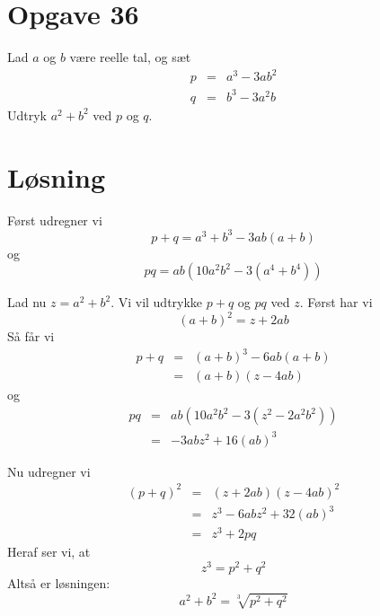 \documentclass[12pt,oneside,a4paper]{article}
\newcommand{\bas}{\begin{eqnarray*}}
\newcommand{\eas}{\end{eqnarray*}}
\begin{document}
\section{Opgave 36}
Lad $a$ og $b$ være reelle tal, og sæt
\bas
p &=& a^3 -3ab^2 \\
q &=& b^3 -3a^2b
\eas
Udtryk $a^2+b^2$ ved $p$ og $q$.

\section{Løsning}
Først udregner vi
$$
p+q = a^3+b^3-3ab(a+b)
$$
og
$$
pq = ab\left(10a^2b^2-3(a^4+b^4)\right)
$$

Lad nu $z=a^2+b^2$. Vi vil udtrykke $p+q$ og $pq$ ved $z$.
Først har vi
$$
(a+b)^2 = z + 2ab
$$
Så får vi
\bas
p+q &=& (a+b)^3-6ab(a+b) \\
    &=& (a+b)(z-4ab)
\eas
og
\bas
pq &=& ab(10a^2b^2-3(z^2-2a^2b^2)) \\
   &=& -3abz^2+16(ab)^3
\eas

Nu udregner vi
\bas
(p+q)^2 &=& (z+2ab) (z-4ab)^2 \\
        &=& z^3-6abz^2+32(ab)^3 \\
        &=& z^3+2pq
\eas
Heraf ser vi, at 
$$
z^3 = p^2+q^2
$$
Altså er løsningen:
$$
a^2+b^2 = \sqrt[3]{p^2+q^2}
$$
\end{document}
